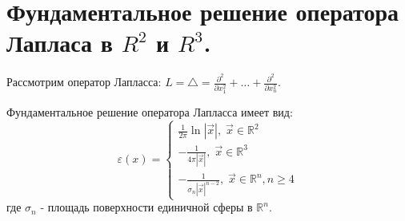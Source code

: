 \chapter{Фундаментальное решение оператора Лапласа в $R^2$ и $R^3$.}
\label{cha:16}

Рассмотрим оператор Лапласса: $L = \triangle = \frac{\partial^2}{\partial x_1^2} + \dots + \frac{\partial^2}{\partial x_n^2}$.

\begin{theorem}\label{lec:16/the:1}
	Фундаментальное решение оператора Лапласса имеет вид:
	$$ \varepsilon (x) = 
	\begin{cases}
		\displaystyle \frac{1}{2 \pi} \ln |\vec{x}|, \; \vec{x} \in \mathbb{R}^2\\
		\displaystyle - \frac{1}{4 \pi |\vec{x}|}, \; \vec{x} \in \mathbb{R}^3 \\
		\displaystyle -\frac{1}{\sigma_n |\vec{x}|^{n-2}}, \; \vec{x} \in \mathbb{R}^n , n \ge 4 
	\end{cases}$$
	где $\sigma_n$ - площадь поверхности единичной сферы в $\mathbb{R}^n$.
\end{theorem}
